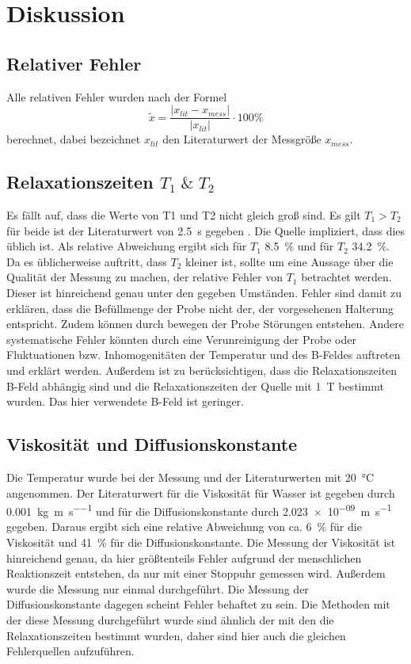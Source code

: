 \section{Diskussion}
\label{sec:Diskussion}
\subsection{Relativer Fehler}
Alle relativen Fehler wurden nach der Formel
\begin{equation*}
  \tilde{x} = \frac{ \lvert x_{lit} - x_{mess} \rvert}{\lvert x_{lit} \rvert}
  \cdot 100 \%
\end{equation*}
berechnet, dabei bezeichnet $x_{lit}$ den Literaturwert der Messgröße $x_{mess}$.
\subsection{Relaxationszeiten \texorpdfstring{$T_1 \; \& \; T_2$}{math}}
Es fällt auf, dass die Werte von T1 und T2 nicht gleich groß sind. Es gilt $T_1 > T_2$ für beide 
ist der Literaturwert von \SI{2,5}{\second} gegeben \cite{hyper}. 
Die Quelle impliziert, dass dies üblich ist. Als 
relative Abweichung ergibt sich für $T_1$ \SI{8,5}{\percent} und für $T_2$ \SI{34,2}{\percent}. Da es üblicherweise auftritt, 
dass $T_2$ kleiner ist, sollte um eine Aussage über die Qualität der Messung zu machen, der relative Fehler von $T_1$ 
betrachtet werden. Dieser ist hinreichend genau unter den gegeben Umständen. Fehler sind damit zu erklären, dass die 
Befüllmenge der Probe nicht der, der vorgesehenen Halterung entspricht. Zudem können durch bewegen der Probe Störungen 
entstehen. Andere systematische Fehler könnten durch eine Verunreinigung der Probe oder Fluktuationen bzw. 
Inhomogenitäten der Temperatur und des B-Feldes auftreten und erklärt werden. Außerdem ist zu berücksichtigen, 
dass die Relaxationszeiten B-Feld abhängig sind und die Relaxationszeiten der Quelle mit \SI{1}{\tesla} bestimmt wurden. 
Das hier verwendete B-Feld ist geringer. 
\subsection{Viskosität und Diffusionskonstante}
Die Temperatur wurde bei der Messung und der Literaturwerten mit \SI{20}{\celsius} angenommen. 
Der Literaturwert für die Viskosität für Wasser ist gegeben durch \SI{0.001}{\kilo\gram\per\meter\per\second} 
\cite{spekvis} und für die Diffusionskonstante durch \SI{2.023e-09}{\meter\per\second} \cite{Diff} gegeben. 
Daraus ergibt sich eine relative Abweichung von ca. \SI{6}{\percent} für die Viskosität und 
\SI{41}{\percent} für die Diffusionskonstante. Die Messung der Viskosität ist hinreichend genau, da hier 
größtenteils Fehler aufgrund der menschlichen Reaktionszeit entstehen, da nur mit einer Stoppuhr gemessen wird. 
Außerdem wurde die Messung nur einmal durchgeführt. Die Messung der Diffusionskonstante dagegen scheint Fehler 
behaftet zu sein. Die Methoden mit der diese Messung durchgeführt wurde sind ähnlich der mit den die 
Relaxationszeiten bestimmt wurden, daher sind hier auch die gleichen Fehlerquellen aufzuführen.
